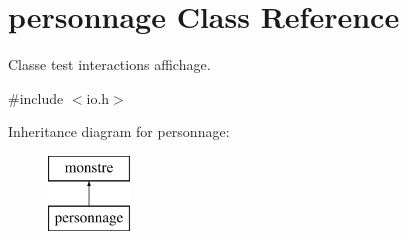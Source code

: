\hypertarget{classpersonnage}{}\section{personnage Class Reference}
\label{classpersonnage}


Classe test interactions affichage.  




{\ttfamily \#include $<$io.\+h$>$}

Inheritance diagram for personnage\+:\begin{figure}[H]
\begin{center}
\leavevmode
\includegraphics[height=2.000000cm]{classpersonnage}
\end{center}
\end{figure}
